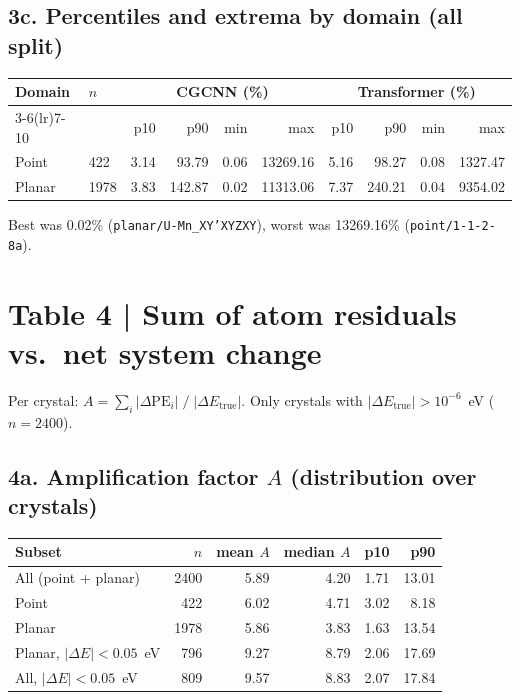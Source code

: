 \documentclass[11pt,a4paper]{article}
\begin{document}
\subsection*{3c. Percentiles and extrema by domain (all split)}

\begin{center}
\footnotesize
\setlength{\tabcolsep}{5pt}
\begin{tabular}{@{}ll *{8}{r} @{}}
  \toprule
  Domain & $n$ & \multicolumn{4}{c}{CGCNN (\%)} & \multicolumn{4}{c}{Transformer (\%)} \\
  \cmidrule(lr){3-6}\cmidrule(lr){7-10}
  & & p10 & p90 & min & max & p10 & p90 & min & max \\
  \midrule
  Point  & 422  & 3.14 & 93.79 & 0.06 & 13269.16 & 5.16 & 98.27 & 0.08 & 1327.47 \\
  Planar & 1978 & 3.83 & 142.87 & 0.02 & 11313.06 & 7.37 & 240.21 & 0.04 & 9354.02 \\
  \bottomrule
\end{tabular}
\end{center}

\noindent Best was 0.02\% (\texttt{planar/U-Mn\_XY'XYZXY}), worst was 13269.16\% (\texttt{point/1-1-2-8a}).

\section*{Table 4 | Sum of atom residuals vs.\ net system change}

Per crystal: $A=\sum_i|\Delta\mathrm{PE}_i|\;/\;|\Delta E_{\mathrm{true}}|$.
Only crystals with $|\Delta E_{\mathrm{true}}|>10^{-6}$~eV ($n=2400$).

\subsection*{4a. Amplification factor $A$ (distribution over crystals)}

\begin{center}
\small
\begin{tabular}{@{}>{\raggedright\arraybackslash}p{4.6cm} *{5}{r} @{}}
  \toprule
  Subset & $n$ & mean $A$ & median $A$ & p10 & p90 \\
  \midrule
  All (point + planar) & 2400 & 5.89 & 4.20 & 1.71 & 13.01 \\
  Point                &  422 & 6.02 & 4.71 & 3.02 &  8.18 \\
  Planar               & 1978 & 5.86 & 3.83 & 1.63 & 13.54 \\
  Planar, $|\Delta E|<0.05$~eV & 796 & 9.27 & 8.79 & 2.06 & 17.69 \\
  All, $|\Delta E|<0.05$~eV   &  809 & 9.57 & 8.83 & 2.07 & 17.84 \\
  \bottomrule
\end{tabular}
\end{center}
\end{document}
